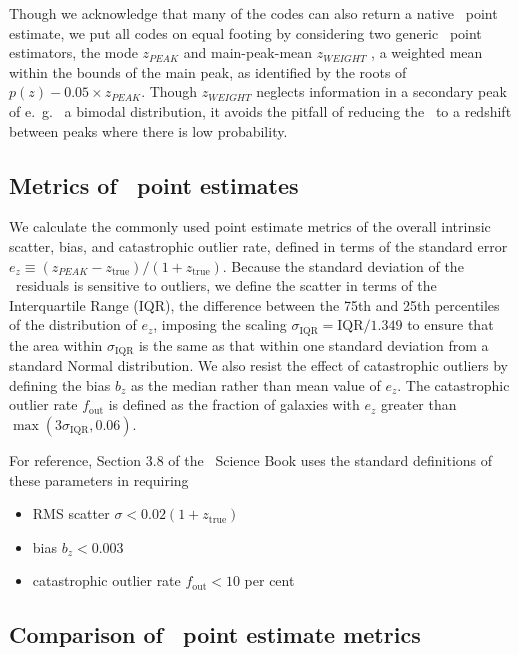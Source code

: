 Though we acknowledge that many of the codes can also return a native \pz\ point estimate, we put all codes on equal footing by considering two generic \pz\ point estimators, the mode $z_{PEAK}$ and main-peak-mean $z_{WEIGHT}$ \citep{Dahlen:13}, a weighted mean within the bounds of the main peak, as identified by the roots of $p(z) - 0.05 \times z_{PEAK}$.
Though $z_{WEIGHT}$ neglects information in a secondary peak of e.~g.~ a bimodal distribution, it avoids the pitfall of reducing the \pzpdf\ to a redshift between peaks where there is low probability.

\subsection{Metrics of \pz\ point estimates}
\label{sec:point_metrics}

We calculate the commonly used point estimate metrics of the overall intrinsic scatter, bias, and catastrophic outlier rate, defined in terms of the standard error $e_{z} \equiv (z_{PEAK} - z_{\mathrm{true}}) / (1 + z_{\mathrm{true}})$.
Because the standard deviation of the \pz\ residuals is sensitive to outliers, we define the scatter in terms of the Interquartile Range (IQR), the difference between the 75th and 25th percentiles of the distribution of $e_{z}$, imposing the scaling $\sigma_{\mathrm{IQR}} = \mathrm{IQR} / 1.349$ to ensure that the area within $\sigma_{\mathrm{IQR}}$ is the same as that within one standard deviation from a standard Normal distribution.
We also resist the effect of catastrophic outliers by defining the bias $b_{z}$ as the median rather than mean value of $e_{z}$.
The catastrophic outlier rate $f_{\mathrm{out}}$ is defined as the fraction of galaxies with $e_{z}$ greater than $\max(3 \sigma_{\mathrm{IQR}}, 0.06)$.

For reference, Section 3.8 of the \lsst\ Science Book \citep{Abell:09} uses the standard definitions of these parameters in requiring
\begin{itemize}
\item RMS scatter $\sigma < 0.02 (1 + z_{\mathrm{true}})$
\item bias $b_{z} < 0.003$ 
\item catastrophic outlier rate $f_{\mathrm{out}} < 10$ per cent 
\end{itemize}

\subsection{Comparison of \pz\ point estimate metrics}
\label{sec:pointmetrics_results}

